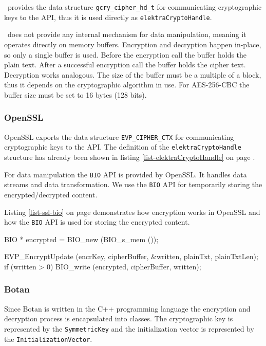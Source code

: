 \gcry ~provides the data structure \texttt{gcry\_cipher\_hd\_t} for communicating cryptographic keys to the API, thus it is used directly as \texttt{elektraCryptoHandle}.

\gcry ~does not provide any internal mechanism for data manipulation, meaning it operates directly on memory buffers.
Encryption and decryption happen in-place, so only a single buffer is used.
Before the encryption call the buffer holds the plain text.
After a successful encryption call the buffer holds the cipher text.
Decryption works analogous.
The size of the buffer must be a multiple of a block, thus it depends on the cryptographic algorithm in use.
For AES-256-CBC the buffer size must be set to 16 bytes (128 bits).
\cite{gnupg-doc}

\subsubsection{OpenSSL}

OpenSSL exports the data structure \texttt{EVP\_CIPHER\_CTX} for communicating cryptographic keys to the API. The definition of the \texttt{elektraCryptoHandle} structure has already been shown in listing \ref{list-elektraCryptoHandle} on page \pageref{list-elektraCryptoHandle}.

For data manipulation the \texttt{BIO} API is provided by OpenSSL.
It handles data streams and data transformation.
We use the \texttt{BIO} API for temporarily storing the encrypted/decrypted content.

Listing \ref{list-ssl-bio} on page \pageref{list-ssl-bio} demonstrates how encryption works in OpenSSL and how the \texttt{BIO} API is used for storing the encrypted content. 

\begin{code}[label=list-ssl-bio,language=C,caption={Encryption in the OpenSSL crypto plugin variant}]
BIO * encrypted = BIO_new (BIO_s_mem ());

EVP_EncryptUpdate (encrKey, cipherBuffer, 
	&written, plainTxt, plainTxtLen);
if (written > 0)
{
	BIO_write (encrypted, cipherBuffer, written);
}
\end{code}

\subsubsection{Botan}

Since Botan is written in the C++ programming language the encryption and decryption process is encapsulated into classes.
The cryptographic key is represented by the \texttt{SymmetricKey} and the initialization vector is represented by the \texttt{InitializationVector}.

